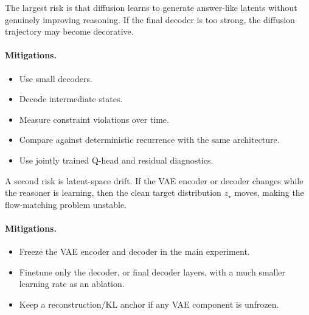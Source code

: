 \documentclass[11pt]{article}
\begin{document}
The largest risk is that diffusion learns to generate answer-like latents without genuinely improving reasoning. If the final decoder is too strong, the diffusion trajectory may become decorative.

\paragraph{Mitigations.}
\begin{itemize}[itemsep=0pt]
    \item Use small decoders.
    \item Decode intermediate states.
    \item Measure constraint violations over time.
    \item Compare against deterministic recurrence with the same architecture.
    \item Use jointly trained Q-head and residual diagnostics.
\end{itemize}

A second risk is latent-space drift. If the VAE encoder or decoder changes while the reasoner is learning, then the clean target distribution \(z_\star\) moves, making the flow-matching problem unstable.

\paragraph{Mitigations.}
\begin{itemize}[itemsep=0pt]
    \item Freeze the VAE encoder and decoder in the main experiment.
    \item Finetune only the decoder, or final decoder layers, with a much smaller learning rate as an ablation.
    \item Keep a reconstruction/KL anchor if any VAE component is unfrozen.
\end{itemize}
\end{document}

